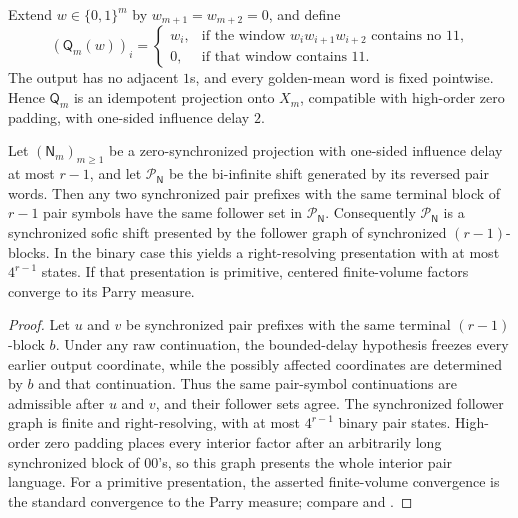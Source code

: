 \begin{example}\label{ex:window-three-projection}
Extend \(w\in\{0,1\}^m\) by \(w_{m+1}=w_{m+2}=0\), and define
\[
(\mathsf Q_m(w))_i=
\begin{cases}
w_i,&\text{if the window \(w_iw_{i+1}w_{i+2}\) contains no \(11\),}\\
0,&\text{if that window contains \(11\).}
\end{cases}
\]
The output has no adjacent \(1\)s, and every golden-mean word is fixed pointwise. Hence \(\mathsf Q_m\) is an idempotent projection onto \(X_m\), compatible with high-order zero padding, with one-sided influence delay \(2\).
\end{example}

\begin{lemma}\label{lem:bounded-delay-pair}
Let \((\mathsf N_m)_{m\ge1}\) be a zero-synchronized projection with one-sided influence delay at most \(r-1\), and let \(\mathcal P_{\mathsf N}\) be the bi-infinite shift generated by its reversed pair words. Then any two synchronized pair prefixes with the same terminal block of \(r-1\) pair symbols have the same follower set in \(\mathcal P_{\mathsf N}\). Consequently \(\mathcal P_{\mathsf N}\) is a synchronized sofic shift presented by the follower graph of synchronized \((r-1)\)-blocks. In the binary case this yields a right-resolving presentation with at most \(4^{r-1}\) states. If that presentation is primitive, centered finite-volume factors converge to its Parry measure.
\end{lemma}

\begin{proof}
Let \(u\) and \(v\) be synchronized pair prefixes with the same terminal \((r-1)\)-block \(b\). Under any raw continuation, the bounded-delay hypothesis freezes every earlier output coordinate, while the possibly affected coordinates are determined by \(b\) and that continuation. Thus the same pair-symbol continuations are admissible after \(u\) and \(v\), and their follower sets agree. The synchronized follower graph is finite and right-resolving, with at most \(4^{r-1}\) binary pair states. High-order zero padding places every interior factor after an arbitrarily long synchronized block of \(00\)'s, so this graph presents the whole interior pair language. For a primitive presentation, the asserted finite-volume convergence is the standard convergence to the Parry measure; compare \cite[Section~8.4]{LindMarcus1995} and \cite[Chapter~2]{Kitchens1998}.
\end{proof}

